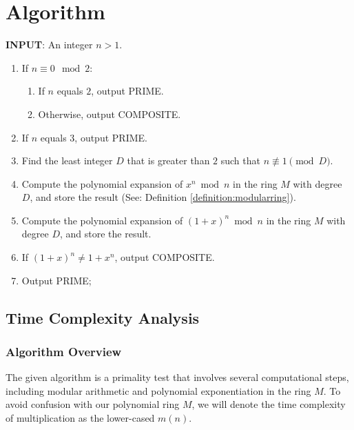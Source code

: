 \documentclass{article}
\theoremstyle{plain}
\theoremstyle{definition}
\newcommand{\Mx}{M}
\begin{document}
\section{Algorithm} \label{section:algorithm}
\textbf{INPUT}: An integer $n > 1$.
\begin{center}
    \begin{enumerate}
        \item If $n \equiv 0 \mod{2}$:
            \begin{enumerate}
                \item If $n$ equals $2$, output PRIME.
                \item Otherwise, output COMPOSITE.
            \end{enumerate}
        \item If $n$ equals $3$, output PRIME.
        \item Find the least integer $D$ that is greater than $2$ such that $n \not\equiv 1 \pmod{D}$.
        \item Compute the polynomial expansion of $x^n \bmod{n}$ in the ring $\Mx$ with degree $D$, and store the result (See: Definition \ref{definition:modularring}).
        \item Compute the polynomial expansion of $(1 + x)^n \bmod{n}$ in the ring $\Mx$ with degree $D$, and store the result.
        \item If $(1 + x)^n \not= 1 + x^n$, output COMPOSITE.
        \item Output PRIME;
    \end{enumerate}
\end{center}

\subsection{Time Complexity Analysis} \label{subsection:timecomplexity}

\subsubsection{Algorithm Overview}
The given algorithm is a primality test that involves several computational steps, including modular arithmetic and polynomial exponentiation in the ring $\Mx$. To avoid confusion with our polynomial ring $\Mx$, we will denote the time complexity of multiplication as the lower-cased $m(n)$.
\end{document}
